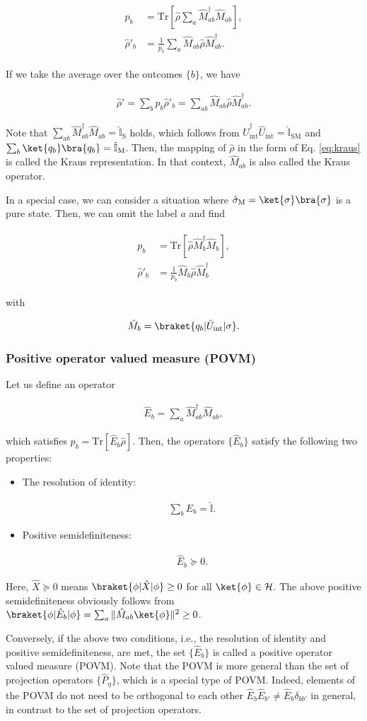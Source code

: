 \documentclass[preprint,pteplogo]{ptephy_v2}%
\numberwithin{equation}{section}
\theoremstyle{definition}
\newcommand{\mr}[1]{\mathrm{#1}}
\newcommand{\mbb}[1]{\mathbb{#1}}
\newcommand{\lrl}[1]{\left[ #1 \right]}
\newcommand{\aln}[1]{
\begin{align}
#1
\end{align}
}
\newcommand{\Tr}{\mr{Tr}}
\begin{document}
\aln{
\begin{split}p_b&=\Tr\lrl{\hat{\rho}\sum_a\hat{M}_{ab}^\dag\hat{M}_{ab}},\\
\hat{\rho}'_b&=\frac{1}{p_b}\sum_a\hat{M}_{ab}\hat{\rho}\hat{M}_{ab}^\dag.
\end{split}}
If we take the average over the outcomes $\{b\}$, we have
\aln{\label{eq:kraus}
\hat{\rho}'=\sum_bp_b\hat{\rho}'_b=\sum_{ab}\hat{M}_{ab}\hat{\rho}\hat{M}_{ab}^\dag.
}
Note that $\sum_{ab}\hat{M}_{ab}^\dag\hat{M}_{ab}=\hat{\mbb{I}}_\mr{S}$ holds, which follows from $\hat{U}_\mr{int}^\dag \hat{U}_\mr{int}=\hat{\mbb{I}}_\mr{SM}$ and $\sum_b\ket{q_b}\bra{q_b}=\hat{\mbb{I}}_\mr{M}$.
Then, the mapping of $\hat{\rho}$ in the form of Eq. \eqref{eq:kraus} is called the Kraus representation.
In that context, $\hat{M}_{ab}$ is also called the Kraus operator.

In a special case, we can consider a situation where $\hat{\sigma}_\mr{M}=\ket{\sigma}\bra{\sigma}$ is a pure state. Then, we can omit the label $a$ and find
\aln{\label{krauspure}
\begin{split}
p_b&=\Tr\lrl{\hat{\rho}\hat{M}_{b}^\dag\hat{M}_{b}},\\
\hat{\rho}'_b&=\frac{1}{p_b}\hat{M}_{b}\hat{\rho}\hat{M}_{b}^\dag
\end{split}}
with
\aln{\label{qbusi}
\hat{M}_{b}=\braket{q_b|\hat{U}_\mr{int}|\sigma}.
}


\subsubsection{Positive operator valued measure (POVM)}
Let us define an operator
\aln{
\hat{E}_b=\sum_a\hat{M}_{ab}^\dag\hat{M}_{ab},
}
which satisfies $p_b=\Tr[\hat{E}_b\hat{\rho}]$.
Then, the operators $\{\hat{E}_b\}$ satisfy the following two properties:
\begin{itemize}
\item 
The resolution of identity:
\aln{
\sum_b\hat{E}_b=\hat{\mbb{I}}.
}
\item 
Positive semidefiniteness:
\aln{
\hat{E}_b\succeq 0.
}
\end{itemize}
Here, $\hat{X}\succeq 0$ means $\braket{\phi|\hat{X}|\phi}\geq 0$ for all $\ket{\phi}\in\mathcal{H}$. 
The above positive semidefiniteness obviously follows from $\braket{\phi|\hat{E}_b|\phi}=\sum_a\|\hat{M}_{ab}\ket{\phi}\|^2\geq 0$.

Conversely, if the above two conditions, i.e., the resolution of identity and positive semidefiniteness, are met, the set $\{\hat{E}_b\}$ is called a positive operator valued measure (POVM).
Note that the POVM is more general than the set of projection operators $\{\hat{P}_\eta\}$, which is a special type of POVM.
Indeed, elements of the POVM do not need to be orthogonal to each other $\hat{E}_b\hat{E}_{b'}\neq \hat{E}_b\delta_{bb'}$ in general, in contrast to the set of projection operators.
\end{document}

